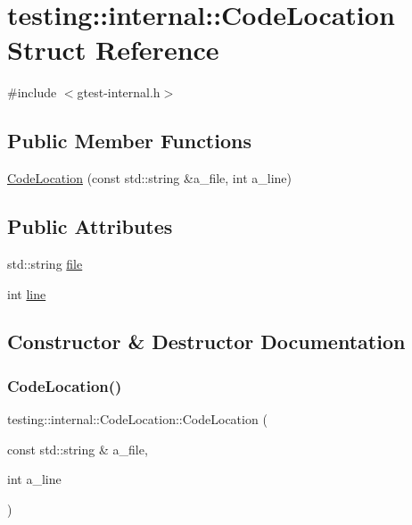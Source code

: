\hypertarget{structtesting_1_1internal_1_1CodeLocation}{}\section{testing\+:\+:internal\+:\+:Code\+Location Struct Reference}
\label{structtesting_1_1internal_1_1CodeLocation}


{\ttfamily \#include $<$gtest-\/internal.\+h$>$}

\subsection*{Public Member Functions}
\begin{DoxyCompactItemize}
\item 
\hyperlink{structtesting_1_1internal_1_1CodeLocation_a323a11851c81629d632c47b9b767b8ac}{Code\+Location} (const std\+::string \&a\+\_\+file, int a\+\_\+line)
\end{DoxyCompactItemize}
\subsection*{Public Attributes}
\begin{DoxyCompactItemize}
\item 
std\+::string \hyperlink{structtesting_1_1internal_1_1CodeLocation_a38118056ad3c11359920274e393bc6b3}{file}
\item 
int \hyperlink{structtesting_1_1internal_1_1CodeLocation_a01c977c7e8834a05a6d6c40b0c416045}{line}
\end{DoxyCompactItemize}


\subsection{Constructor \& Destructor Documentation}
\mbox{\label{structtesting_1_1internal_1_1CodeLocation_a323a11851c81629d632c47b9b767b8ac}} 
\subsubsection{\texorpdfstring{Code\+Location()}{CodeLocation()}}
{\footnotesize\ttfamily testing\+::internal\+::\+Code\+Location\+::\+Code\+Location (\begin{DoxyParamCaption}\item[{const std\+::string \&}]{a\+\_\+file,  }\item[{int}]{a\+\_\+line }\end{DoxyParamCaption})\hspace{0.3cm}{\ttfamily [inline]}}



